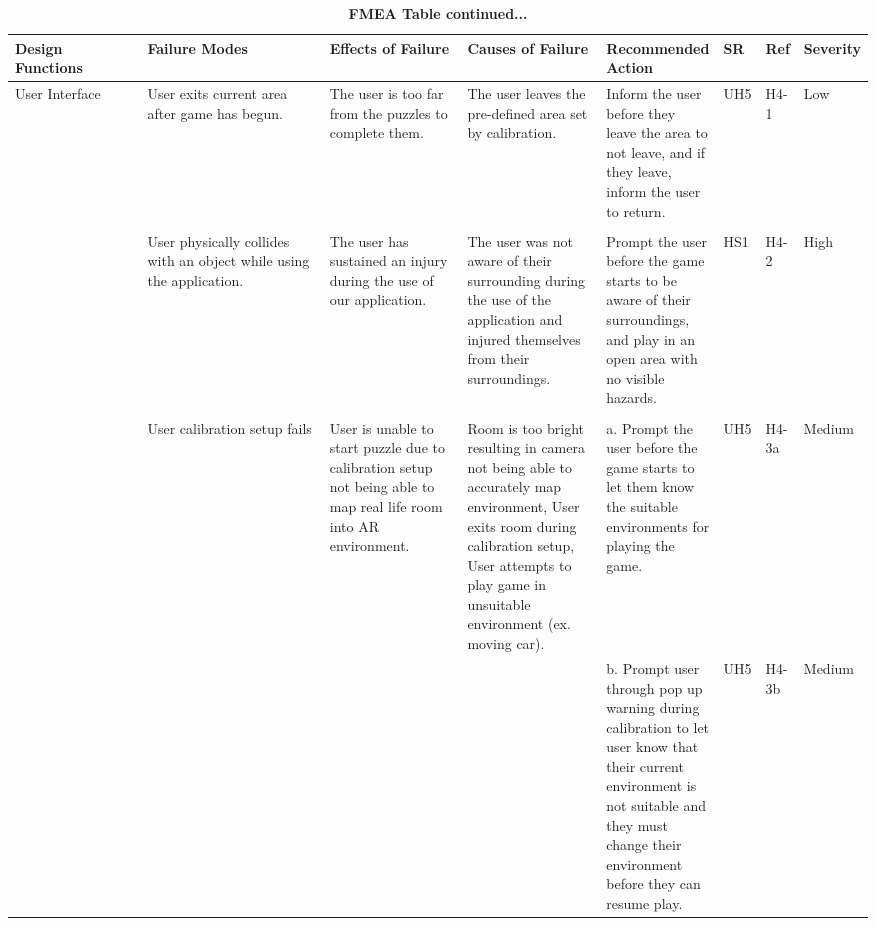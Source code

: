 \documentclass{article}
\begin{document}
\begin{table}[H]
    \begin{adjustbox}{width=(/5)}
    \centering
    

    \begin{tabular}{|p{0.20\linewidth} | p{0.30\linewidth} | p{0.20\linewidth}|  p{0.20\linewidth}|  p{0.30\linewidth}|  p{0.07\linewidth}|  p{0.09\linewidth}|p{0.12\linewidth}| }
    \hline
         \textbf{Design Functions} & \textbf{Failure Modes} & \textbf{Effects of Failure} & \textbf{Causes of Failure} & \textbf{Recommended Action} & \textbf{SR} & \textbf{Ref} & \textbf{Severity}\\
         \hline
          User Interface                   &           User exits current area after game has begun.            &           The user is too far from the puzzles to complete them.           &                The user leaves the pre-defined area set by calibration.            &           Inform the user before they leave the area to not leave, and if they leave, inform the user to return.                  &   UH5          &   H4-1           &   Low               \\&&&&&&&  \\
            &    User physically collides with an object while using the application.    &    The user has sustained an injury during the use of our application.      &  The user was not aware of their surrounding during the use of the application and injured themselves from their surroundings. \newline                 &    Prompt the user before the game starts to be aware of their surroundings, and play in an open area with no visible hazards.    &  HS1           &   H4-2     & High\\&&&&&&&               \\
                                   &    User calibration setup fails   &   User is unable to start puzzle due to calibration setup not being able to map real life room into AR environment. & Room is too bright resulting in camera not being able to accurately map environment, User exits room during calibration setup, User attempts to play game in unsuitable environment (ex. moving car). & a. Prompt the user before the game starts to let them know the suitable environments for playing the game. &UH5&H4-3a& Medium\\&&&& b. Prompt user through pop up warning during calibration to let user know that their current environment is not suitable and they must change their environment before they can resume play.   & UH5   & H4-3b & Medium   \\
          \hline
    \end{tabular}
    \end{adjustbox}
    \caption{\bf FMEA Table continued...}
    \label{tab:FMEA2}
\end{table}
\end{document}
